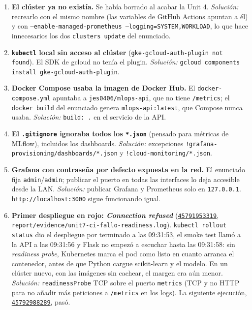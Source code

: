 \documentclass[11pt,a4paper]{article}
\newcommand{\code}[1]{\texttt{#1}}
\newcommand{\run}[1]{\href{https://github.com/JES0406/mlops-practica-icai/actions/runs/#1}{\code{#1}}}
\begin{document}
\begin{enumerate}[label=\textbf{D\arabic*.}, ref=D\arabic*, leftmargin=2.4em, itemsep=0.5em]

\item \textbf{El clúster ya no existía.} Se había borrado al acabar la Unit 4.
  \emph{Solución:} recrearlo con el mismo nombre (las variables de GitHub Actions apuntan a
  él) y con \code{--enable-managed-prometheus --logging=SYSTEM,WORKLOAD}, lo que hace
  innecesarios los dos \code{clusters update} del enunciado.

\item \textbf{\code{kubectl} local sin acceso al clúster}
  (\code{gke-gcloud-auth-plugin not found}). El SDK de gcloud no tenía el plugin.
  \emph{Solución:} \code{gcloud components install gke-gcloud-auth-plugin}.

\item \textbf{Docker Compose usaba la imagen de Docker Hub.} El \code{docker-compose.yml}
  apuntaba a \code{jes0406/mlops-api}, que no tiene \code{/metrics}; el \code{docker build}
  del enunciado genera \code{mlops-api:latest}, que Compose nunca usaba.
  \emph{Solución:} \code{build: .} en el servicio de la API.

\item \textbf{El \code{.gitignore} ignoraba todos los \code{*.json}} (pensado para métricas
  de MLflow), incluidos los dashboards. \emph{Solución:} excepciones
  \code{!grafana-provisioning/dashboards/*.json} y \code{!cloud-monitoring/*.json}.

\item \textbf{Grafana con contraseña por defecto expuesta en la red.} El enunciado fija
  \code{admin}/\code{admin}; publicar el puerto en todas las interfaces lo deja accesible
  desde la LAN. \emph{Solución:} publicar Grafana y Prometheus solo en \code{127.0.0.1}.
  \code{http://localhost:3000} sigue funcionando igual.

\item \label{dif:readiness}\textbf{Primer despliegue en rojo: \emph{Connection refused}}
  (\run{45791953319}, \code{report/evidence/unit7-ci-fallo-readiness.log}).
  \code{kubectl rollout status} dio el despliegue por terminado a las 09:31:53, el smoke test
  llamó a la API a las 09:31:56 y Flask no empezó a escuchar hasta las 09:31:58: sin
  \emph{readiness probe}, Kubernetes marca el pod como listo en cuanto arranca el contenedor,
  antes de que Python cargue scikit-learn y el modelo. En un clúster nuevo, con las imágenes
  sin cachear, el margen era aún menor. \emph{Solución:} \code{readinessProbe} TCP sobre el
  puerto \code{metrics} (TCP y no HTTP para no añadir más peticiones a \code{/metrics} en los
  logs). La siguiente ejecución, \run{45792988289}, pasó.


\end{enumerate}
\end{document}
